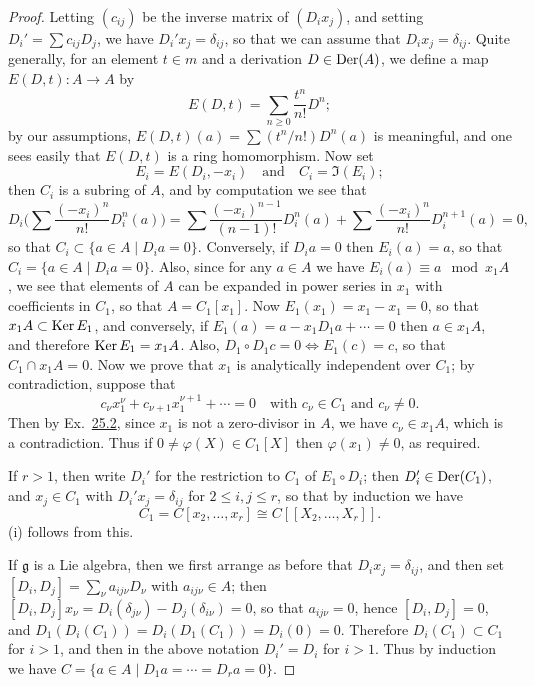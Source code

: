 \begin{proof}
Letting $(c_{ij})$ be the inverse matrix of $(D_ix_j)$, and setting
$D_i' = \sum c_{ij}D_j$, we have $D_i'x_j = \delta_{ij}$, so that we can assume that
$D_ix_j = \delta_{ij}$. Quite generally, for an element $t \in m$ and a derivation
$D \in \operatorname{Der}(A)$, we define a map $E(D, t)\colon A \to A$ by
\[
  E(D, t) = \sum_{n \ge 0} \frac{t^n}{n!}D^n;
\]
by our assumptions, $E(D, t)(a) = \sum (t^n/n!)D^n(a)$ is meaningful, and one sees
easily that $E(D, t)$ is a ring homomorphism. Now set
\[
  E_i = E(D_i, -x_i) \quad \text{and} \quad C_i = \Im(E_i);
\]
then $C_i$ is a subring of $A$, and by computation we see that
\[
  D_i\Big(\sum \frac{(-x_i)^n}{n!}D_i^n(a)\Big) = \sum \frac{(-x_i)^{n-1}}{(n-1)!}D_i^n(a)
      + \sum \frac{(-x_i)^n}{n!}D_i^{n+1}(a) = 0,
\]
so that $C_i \subset \{a \in A \mid D_ia = 0\}$. Conversely, if $D_ia = 0$ then
$E_i(a) = a$, so that $C_i = \{a \in A \mid D_ia = 0\}$. Also, since for any $a \in A$ we have
$E_i(a) \equiv a \mod x_1A$, we see that elements of $A$ can be expanded in power
series in $x_1$ with coefficients in $C_1$, so that $A = C_1[x_1]$. Now
$E_1(x_1) = x_1 - x_1 = 0$, so that $x_1A \subset \operatorname{Ker} E_1$, and conversely, if
$E_1(a) = a - x_1D_1a + \cdots = 0$ then $a \in x_1A$, and therefore $\operatorname{Ker} E_1 = x_1A$.
Also, $D_1 \circ D_1c = 0 \iff E_1(c) = c$, so that $C_1 \cap x_1A = 0$. Now we prove
that $x_1$ is analytically independent over $C_1$; by contradiction, suppose that
\[
  c_\nu x_1^\nu + c_{\nu+1}x_1^{\nu+1} + \cdots = 0 \quad \text{with } c_\nu \in C_1
      \text{ and } c_\nu \ne 0.
\]
Then by Ex.~\hyperref[ex:25.2-ex]{25.2}, since $x_1$ is not a zero-divisor in $A$, we have
$c_\nu \in x_1A$, which is a contradiction. Thus if $0 \ne \varphi(X) \in C_1[X]$ then
$\varphi(x_1) \ne 0$, as required.

If $r > 1$, then write $D_i'$ for the restriction to $C_1$ of $E_1 \circ D_i$; then
$D_i' \in \operatorname{Der}(C_1)$, and $x_j \in C_1$ with $D_i'x_j = \delta_{ij}$ for $2 \le i, j \le r$, so that by
induction we have
\[
  C_1 = C[x_2, \ldots, x_r] \cong C[[X_2, \ldots, X_r]].
\]
(i) follows from this.

If $\mathfrak{g}$ is a Lie algebra, then we first arrange as before that $D_ix_j = \delta_{ij}$,
and then set $[D_i, D_j] = \sum_\nu a_{ij\nu}D_\nu$ with $a_{ij\nu} \in A$; then
$[D_i, D_j]x_\nu = D_i(\delta_{j\nu}) - D_j(\delta_{i\nu}) = 0$, so that $a_{ij\nu} = 0$, hence
$[D_i, D_j] = 0$, and $D_1(D_i(C_1)) = D_i(D_1(C_1)) = D_i(0) = 0$. Therefore
$D_i(C_1) \subset C_1$ for $i > 1$, and then in the above notation $D_i' = D_i$ for $i > 1$.
Thus by induction we have $C = \{a \in A \mid D_1a = \cdots = D_ra = 0\}$.
\end{proof}

